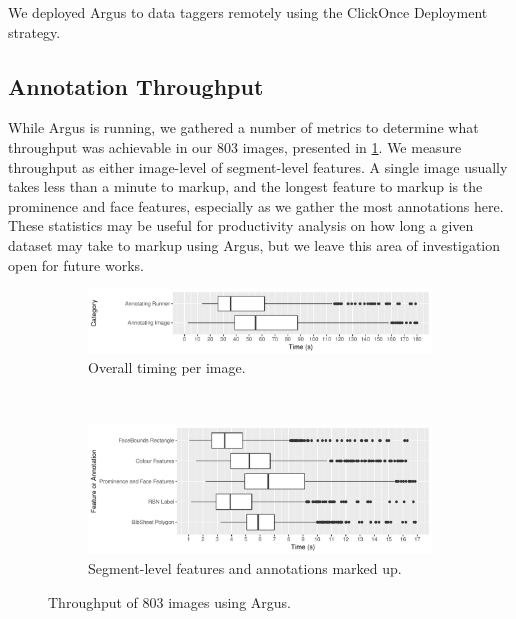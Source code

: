 We deployed Argus to data taggers remotely using the ClickOnce Deployment strategy.

\clearpage

\subsection{Annotation Throughput}
\label{sec:dataset:argus:metrics}

While Argus is running, we gathered a number of metrics to determine what throughput was achievable in our 803 images, presented in  \cref{fig:dataset:argus:metrics:throughput}. We measure throughput as either image-level of segment-level features. A single image usually takes less than a minute to markup, and the longest feature to markup is the prominence and face features, especially as we gather the most annotations here. These statistics may be useful for productivity analysis on how long a given dataset may take to markup using Argus, but we leave this area of investigation open for future works.

\begin{figure}[h]
  \begin{subfigure}[b]{\textwidth}
    \includegraphics[width=\textwidth]{images/dataset/argus/photo_box_plots}
    \caption{Overall timing per image.}   
  \end{subfigure}
  \smallskip
  \\
  \begin{subfigure}[b]{\textwidth}
    \includegraphics[width=\textwidth]{images/dataset/argus/feature_box_plots}
    \caption{Segment-level features and annotations marked up.}   
  \end{subfigure}
  \caption[Throughput of images using Argus]{Throughput of 803 images using Argus.}
  \label{fig:dataset:argus:metrics:throughput}
\end{figure}

